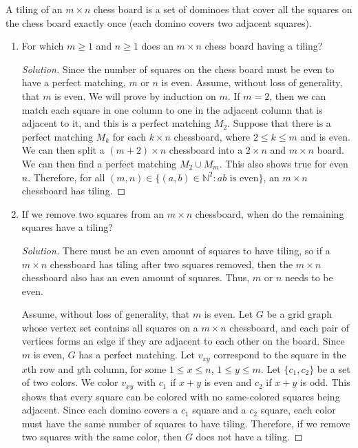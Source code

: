 \documentclass{article}
\newenvironment{problem}[2][Question]{\begin{trivlist}
\item[\hskip \labelsep {\bfseries #1}\hskip \labelsep {\bfseries #2.}]}{\end{trivlist}}
\begin{document}
\begin{problem}{3.8.2}
    A tiling of an $m \times n$ chess board is a set of dominoes that cover all the squares on the chess board exactly once (each domino covers two adjacent squares).
\end{problem}
\begin{enumerate}[label=(\alph*)]
    \item For which $m \geq 1$ and $n \geq 1$ does an $m \times n$ chess board having a tiling?
    \begin{proof}[Solution]
        Since the number of squares on the chess board must be even to have a perfect matching, $m$ or $n$ is even. Assume, without loss of generality, that $m$ is even. We will prove by induction on $m$. If $m = 2$,  then we can match each square in one column to one in the adjacent column that is adjacent to it, and this is a perfect matching $M_2$. Suppose that there is a perfect matching $M_k$ for each $k \times n$ chessboard, where $2 \leq k \leq m$ and is even. We can then split a $(m + 2) \times n$ chessboard into a $2 \times n$ and $m \times n$ board. We can then find a perfect matching $M_2 \cup M_m$. This also shows true for even $n$. Therefore, for all $(m,n) \in \{(a, b) \in \mathbb{N}^2: ab \text{ is even}\}$, an $m \times n$ chessboard has tiling. 
    \end{proof}
    
    \item If we remove two squares from an $m \times n$ chessboard, when do the remaining squares have a tiling?
    \begin{proof}[Solution]
        There must be an even amount of squares to have tiling, so if a $m \times n$ chessboard has tiling after two squares removed, then the $m \times n$ chessboard also has an even amount of squares. Thus, $m$ or $n$ needs to be even.

        Assume, without loss of generality, that $m$ is even. Let $G$ be a grid graph whose vertex set contains all squares on a $m \times n$ chessboard, and each pair of vertices forms an edge if they are adjacent to each other on the board. Since $m$ is even, $G$ has a perfect matching. Let $v_{xy}$ correspond to the square in the $x$th row and $y$th column, for some $1 \leq x \leq n$, $1 \leq y \leq m$. Let $\{c_1, c_2\}$ be a set of two colors. We color $v_{xy}$ with $c_1$ if $x + y$ is even and $c_2$ if $x + y$ is odd. This shows that every square can be colored with no same-colored squares being adjacent. Since each domino covers a $c_1$ square and a $c_2$ square, each color must have the same number of squares to have tiling. Therefore, if we remove two squares with the same color, then $G$ does not have a tiling.
        

\end{proof}
\end{enumerate}
\end{document}
